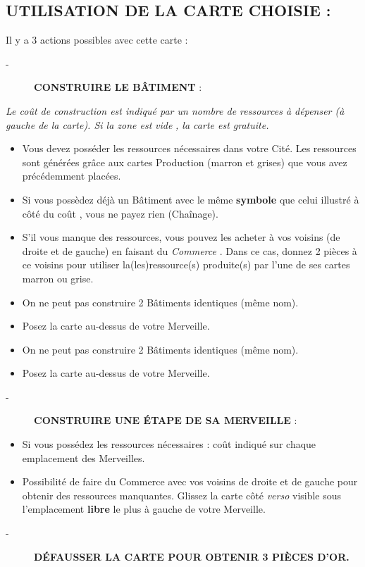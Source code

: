 \documentclass{article}%
\begin{document}
%
\subsection{ UTILISATION DE LA CARTE CHOISIE :
}%
\label{subsec:UTILISATIONDELACARTECHOISIE}%
Il y a 3 actions possibles avec cette carte :
%
\begin{description}%
\item[{-} ]%
%
\textbf{CONSTRUIRE LE BÂTIMENT}%
\textit{ }%
 :
%
\end{description}%
\textit{ Le coût de construction est indiqué par un nombre de ressources à dépenser (à gauche de la carte). Si la zone est }%
\textit{vide}%
\textit{, la carte est gratuite.
}%
\begin{itemize}%
\item%
%
 Vous devez posséder les ressources nécessaires dans votre Cité. Les ressources sont générées grâce aux cartes Production (marron et grises) que vous avez précédemment placées.
%
\item%
%
 Si vous possèdez déjà un Bâtiment avec le même %
\textbf{symbole}%
\textit{ }%
 que celui illustré à côté du coût , vous ne payez rien (Chaînage).
%
\item%
%
 S'il vous manque des ressources, vous pouvez les acheter à vos voisins (de droite et de gauche) en faisant du %
\textit{Commerce}%
. Dans ce cas, donnez 2 pièces à ce voisins pour utiliser la(les)ressource(s) produite(s) par l'une de ses cartes marron ou grise.
%
\item%
%
 On ne peut pas construire 2 Bâtiments identiques (même nom).
%
\item%
%
 Posez la carte au{-}dessus de votre Merveille.
%
\end{itemize}%
\begin{itemize}%
\item%
%
 On ne peut pas construire 2 Bâtiments identiques (même nom).
%
\item%
%
 Posez la carte au{-}dessus de votre Merveille.
%
\end{itemize}%
\begin{description}%
\item[{-} ]%
%
\textbf{CONSTRUIRE UNE ÉTAPE DE SA MERVEILLE}%
\textit{ }%
 :
%
\end{description}%
\begin{itemize}%
\item%
%
 Si vous possédez les ressources nécessaires : coût indiqué sur chaque emplacement des Merveilles.
%
\item%
%
 Possibilité de faire du Commerce avec vos voisins de droite et de gauche pour obtenir des ressources manquantes. Glissez la carte côté %
\textit{verso}%
\textit{ }%
 visible sous l’emplacement %
\textbf{libre}%
\textit{ }%
 le plus à gauche de votre Merveille.
%
\end{itemize}%
\begin{description}%
\item[{-} ]%
%
\textbf{DÉFAUSSER LA CARTE POUR OBTENIR 3 PIÈCES D’OR.}%

%
\end{description}
\end{document}
